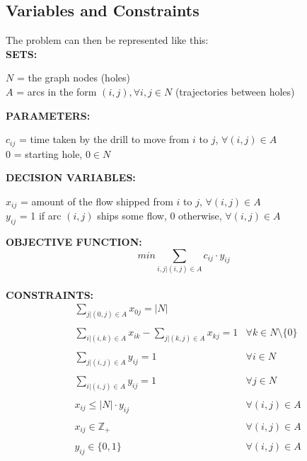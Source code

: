 	\subsection{Variables and Constraints}
		The problem can then be represented like this:\\
		\newline
		\textbf{SETS:}\\
		\begin{addmargin}[2em]{0em}
			$N$ = the graph nodes (holes)\\
			$A$ = arcs in the form $(i, j), ∀ i, j ∈ N$ (trajectories between holes)\\
		\end{addmargin}
		\textbf{PARAMETERS:}\\
		\begin{addmargin}[2em]{0em}
			$c_{ij}$ = time taken by the drill to move from $i$ to $j$, $∀ (i, j) ∈ A$\\
			$0$ = starting hole, $0 ∈ N$\\
		\end{addmargin}
		\textbf{DECISION VARIABLES:}\\
		\begin{addmargin}[2em]{0em}
			$x_{ij}$ = amount of the flow shipped from $i$ to $j$, $∀ (i, j) ∈ A$\\
			$y_{ij}$ = 1 if arc $(i, j)$ ships some flow, 0 otherwise, $∀ (i, j) ∈ A$\\
		\end{addmargin}
		\textbf{OBJECTIVE FUNCTION:}\\
		\[min \sum_{i, j | (i, j) ∈ A} c_{ij} \cdot y_{ij}\]\\
		\textbf{CONSTRAINTS:}
		\begin{align*}
			&\sum_{j | (0,j) ∈ A} x_{0j} = |N|\\
			\\
			&\sum_{i | (i, k) ∈ A} x_{ik} - \sum_{j | (k, j) ∈ A} x_{kj} = 1 & ∀ k ∈ N \setminus \{0\}\\
			\\
			&\sum_{j | (i, j) ∈ A} y_{ij} = 1 & ∀ i ∈ N\\
			\\
			&\sum_{i | (i, j) ∈ A} y_{ij} = 1 & ∀ j ∈ N\\
			\\
			&x_{ij} \leq |N| \cdot y_{ij} & ∀ (i, j) ∈ A\\
			\\
			&x_{ij} ∈ \mathbb{Z}_{+} & ∀ (i, j) ∈ A\\
			\\
			&y_{ij} ∈ \{0, 1\} & ∀ (i, j) ∈ A
		\end{align*}

		
		